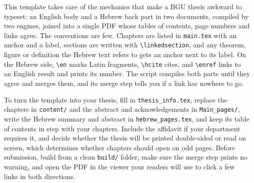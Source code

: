 
This template takes care of the mechanics that make a BGU thesis awkward to typeset: an English body and a Hebrew back part in two documents, compiled by two engines, joined into a single PDF whose tables of contents, page numbers and links agree.
The conventions are few.
Chapters are listed in \texttt{main.tex} with an anchor and a label, sections are written with \verb|\linkedsection|, and any theorem, figure or definition the Hebrew text refers to gets an anchor next to its label.
On the Hebrew side, \verb|\en| marks Latin fragments, \verb|\hcite| cites, and \verb|\enref| links to an English result and prints its number.
The script compiles both parts until they agree and merges them, and its merge step tells you if a link has nowhere to go.

To turn the template into your thesis, fill in \texttt{thesis\_info.tex}, replace the chapters in \texttt{content/} and the abstract and acknowledgements in \texttt{Main\_pages/}, write the Hebrew summary and abstract in \texttt{hebrew\_pages.tex}, and keep its table of contents in step with your chapters.
Include the affidavit if your department requires it, and decide whether the thesis will be printed double-sided or read on screen, which determines whether chapters should open on odd pages.
Before submission, build from a clean \texttt{build/} folder, make sure the merge step prints no warning, and open the PDF in the viewer your readers will use to click a few links in both directions.
